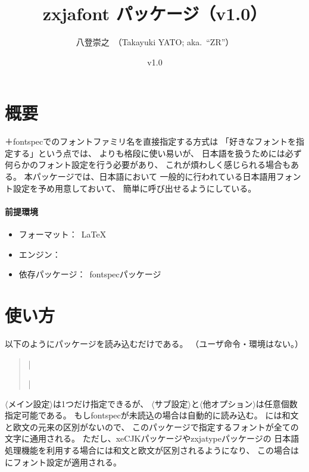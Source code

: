 \documentclass[xelatex,ja=standard,jafont=ipaex,
  a4paper]{bxjsarticle}
\newcommand{\PkgVersion}{1.0}
\newcommand{\PkgDate}{2020/02/02}
\newcommand{\Pkg}[1]{\textsf{#1}}
\newcommand{\Meta}[1]{$\langle$\mbox{}#1\mbox{}$\rangle$}
\newcommand{\Means}{：\ }
\newcommand{\JEmph}{\textgt}
\begin{document}
\title{\Pkg{zxjafont} パッケージ（v\PkgVersion）}
\author{八登崇之\ （Takayuki YATO; aka.~``ZR''）}
\date{v\PkgVersion\quad[\PkgDate]}
\maketitle

\section{概要}

{\XeLaTeX}＋\Pkg{fontspec}でのフォントファミリ名を直接指定する方式は
「好きなフォントを指定する」という点では、
{\pLaTeX}\>よりも格段に使い易いが、
日本語を扱うためには必ず何らかのフォント設定を行う必要があり、
これが煩わしく感じられる場合もある。
本パッケージでは、日本語\>{\LaTeX}\>において
一般的に行われている日本語用フォント設定を予め用意しておいて、
簡単に呼び出せるようにしている。

\paragraph{前提環境}\mbox{}
\begin{itemize}
\item フォーマット\Means {\LaTeX}
\item エンジン\Means {\XeTeX}
\item 依存パッケージ\Means \Pkg{fontspec}パッケージ
\end{itemize}

\section{使い方}

以下のようにパッケージを読み込むだけである。
（ユーザ命令・環境はない。）
\begin{quote}\small
|\usepackage[|\Meta{メイン設定}|,|\Meta{サブ設定}|,|%
\Meta{他オプション}|]{zxjafont}|
\end{quote}

\Meta{メイン設定}は1つだけ指定できるが、
\Meta{サブ設定}と\Meta{他オプション}は任意個数指定可能である。
もし\Pkg{fontspec}が未読込の場合は自動的に読み込む。
{\XeLaTeX}\>には和文と欧文の元来の区別がないので、
このパッケージで指定するフォントが全ての文字に通用される。
ただし、\Pkg{xeCJK}パッケージや\Pkg{zxjatype}パッケージの
日本語処理機能を利用する場合には和文と欧文が区別されるようになり、
この場合は\JEmph{和文のみ}にフォント設定が適用される。
\end{document}
